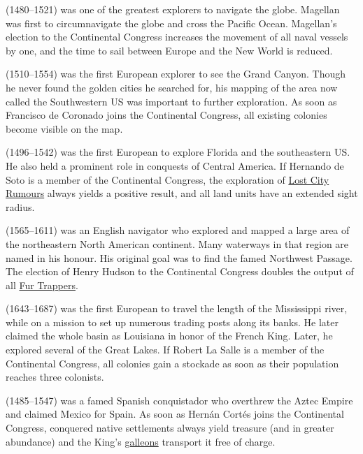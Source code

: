 \documentclass[12pt]{article}
\begin{document}
 (1480--1521) was one of the greatest
explorers to navigate the globe. Magellan was first to circumnavigate
the globe and cross the Pacific Ocean. Magellan's election to the
Continental Congress increases the movement of all naval vessels by
one, and the time to sail between Europe and the New World is
reduced. 

(1510--1554) was the first European explorer to see the Grand
Canyon. Though he never found the golden cities he searched for, his
mapping of the area now called the Southwestern US was important to
further exploration. As soon as Francisco de Coronado joins the
Continental Congress, all existing colonies become visible on the
map. 

 (1496--1542) was the first European to
explore Florida and the southeastern US.  He also held a prominent
role in conquests of Central America. If Hernando de Soto is a member
of the Continental Congress, the exploration of \hyperlink{Lost City
Rumours}{Lost City Rumours} always yields a positive result, and all land
units have an extended sight radius. 

 (1565--1611) was an English navigator who
explored and mapped a large area of the northeastern North American
continent.  Many waterways in that region are named in his honour. His
original goal was to find the famed Northwest Passage. The election of
Henry Hudson to the Continental Congress doubles the output of all
\hyperlink{Expert Fur Trapper}{Fur Trappers}. 

 (1643--1687) was the first European to travel
the length of the Mississippi river, while on a mission to set up
numerous trading posts along its banks.  He later claimed the whole
basin as Louisiana in honor of the French King. Later, he explored
several of the Great Lakes. If Robert La Salle is a member of the
Continental Congress, all colonies gain a stockade as soon as their
population reaches three colonists. 

 (1485--1547) was a famed Spanish
conquistador who overthrew the Aztec Empire and claimed Mexico for
Spain. As soon as Hern\'an Cort\'es joins the Continental Congress,
conquered native settlements always yield treasure (and in greater
abundance) and the King's \hyperlink{Galleon}{galleons} transport it
free of charge. 
\end{document}
